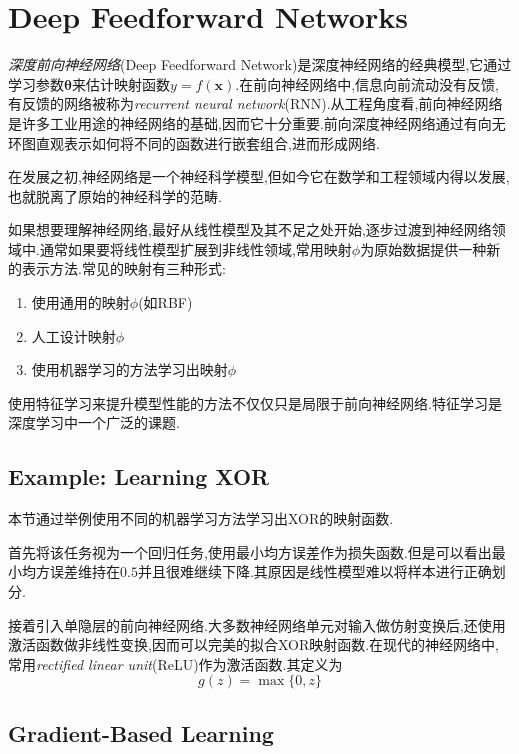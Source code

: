 \chapter{Deep Feedforward Networks}

\textit{深度前向神经网络}(Deep Feedforward Network)是深度神经网络的经典模型,它通过学习参数${\bm\theta}$来估计映射函数$y=f(\bm x)$.在前向神经网络中,信息向前流动没有反馈,有反馈的网络被称为\textit{recurrent neural network}(RNN).从工程角度看,前向神经网络是许多工业用途的神经网络的基础,因而它十分重要.前向深度神经网络通过有向无环图直观表示如何将不同的函数进行嵌套组合,进而形成网络.

在发展之初,神经网络是一个神经科学模型,但如今它在数学和工程领域内得以发展,也就脱离了原始的神经科学的范畴.

如果想要理解神经网络,最好从线性模型及其不足之处开始,逐步过渡到神经网络领域中.通常如果要将线性模型扩展到非线性领域,常用映射$\phi$为原始数据提供一种新的表示方法.常见的映射有三种形式:
\begin{enumerate}
\item 使用通用的映射$\phi$(如RBF)
\item 人工设计映射$\phi$
\item 使用机器学习的方法学习出映射$\phi$
\end{enumerate}

使用特征学习来提升模型性能的方法不仅仅只是局限于前向神经网络.特征学习是深度学习中一个广泛的课题.

\section{Example: Learning XOR}

本节通过举例使用不同的机器学习方法学习出XOR的映射函数.

首先将该任务视为一个回归任务,使用最小均方误差作为损失函数.但是可以看出最小均方误差维持在$0.5$并且很难继续下降.其原因是线性模型难以将样本进行正确划分.

接着引入单隐层的前向神经网络.大多数神经网络单元对输入做仿射变换后,还使用激活函数做非线性变换,因而可以完美的拟合XOR映射函数.在现代的神经网络中,常用\textit{rectified linear unit}(ReLU)作为激活函数.其定义为
\begin{equation}
g(z)=\max\{0,z\}
\end{equation}

\section{Gradient-Based Learning}

